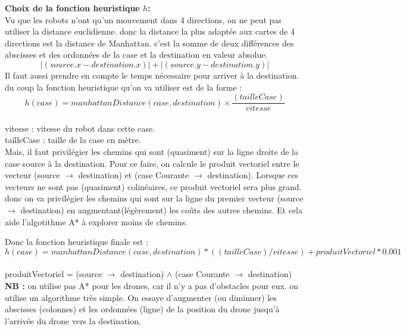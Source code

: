 \documentclass[french, 11pt]{article}
\begin{document}
\textbf{Choix de la fonction heuristique $h$:} \\
	Vu que les robots n’ont qu’un mouvement dans 4 directions, on ne peut pas utiliser la distance euclidienne. donc la distance la plus adaptée aux cartes de 4 directions est la distance de Manhattan. c’est la somme de deux différences des abscisses et des ordonnées de la case et la destination en valeur absolue.
$$|(source.x - destination.x)| + |(source.y - destination.y)|$$
Il faut aussi prendre en compte le temps nécessaire pour arriver à la destination. du coup la fonction heuristique qu’on va utiliser est de la forme :
$$h(case) = manhattanDistance(case, destination)\times{\frac{(tailleCase)}{vitesse}}$$ \\
vitesse : vitesse du robot dans cette case. \\
tailleCase : taille de la case en mètre. \\

	Mais, il faut privilégier les chemins qui sont (quasiment) sur la ligne droite de la case source à la destination. Pour ce faire, on calcule le produit vectoriel entre le vecteur (source $ \rightarrow$ destination) et (case Courante $ \rightarrow$ destination). Lorsque ces vecteurs ne sont pas (quasiment) colinéaires, ce produit vectoriel sera plus grand. donc on va privilégier les chemins qui sont sur la ligne du premier vecteur (source $ \rightarrow$ destination) en augmentant(légèrement) les coûts des autres chemins. Et cela aide l’algotithme A* à explorer moins de chemins.
	
Donc la fonction heuristique finale est :
 $$\boxed{h(case) = manhattanDistance(case, destination) *( (tailleCase) / vitesse) + produitVectoriel * 0.001}$$ \\
 produitVectoriel = (source $ \rightarrow$ destination) $\wedge$ (case Courante $ \rightarrow$ destination) \\
 
 \textbf{NB :} on utilise pas A* pour les drones, car il n’y a pas d’obstacles pour eux. on utilise un algorithme très simple. On essaye d’augmenter (ou diminuer) les abscisses (colonnes) et les ordonnées (ligne) de la position du drone jusqu’à l’arrivée du drone vers la destination.

	\label{LastMainPage}
		
\end{document}
